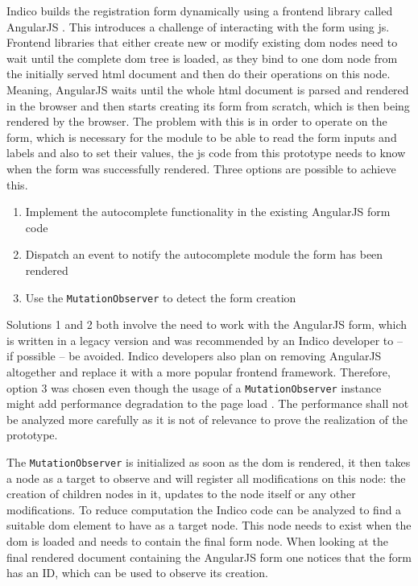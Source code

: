 Indico builds the registration form dynamically using a frontend library called AngularJS \cite{angularjs}. This introduces a challenge of interacting with the form using \gls{js}. Frontend libraries that either create new or modify existing \gls{dom} nodes need to wait until the complete \gls{dom} tree is loaded, as they bind to one \gls{dom} node from the initially served \gls{html} document and then do their operations on this node. Meaning, AngularJS waits until the whole \gls{html} document is parsed and rendered in the browser and then starts creating its form from scratch, which is then being rendered by the browser. The problem with this is in order to operate on the form, which is necessary for the module to be able to read the form inputs and labels and also to set their values, the \gls{js} code from this prototype needs to know when the form was successfully rendered. Three options are possible to achieve this.

\begin{enumerate}
    \item Implement the autocomplete functionality in the existing AngularJS form code
    \item Dispatch an event to notify the autocomplete module the form has been rendered
    \item Use the \texttt{MutationObserver} to detect the form creation
\end{enumerate}

Solutions 1 and 2 both involve the need to work with the AngularJS form, which is written in a legacy version and was recommended by an Indico developer to -- if possible -- be avoided. Indico developers also plan on removing AngularJS altogether and replace it with a more popular frontend framework. Therefore, option 3 was chosen even though the usage of a \texttt{MutationObserver} instance might add performance degradation to the page load \cite{dom-spec}. The performance shall not be analyzed more carefully as it is not of relevance to prove the realization of the prototype.

The \texttt{MutationObserver} is initialized as soon as the \gls{dom} is rendered, it then takes a node as a target to observe and will register all modifications on this node: the creation of children nodes in it, updates to the node itself or any other modifications. To reduce computation the Indico code can be analyzed to find a suitable \gls{dom} element to have as a target node. This node needs to exist when the \gls{dom} is loaded and needs to contain the final form node. When looking at the final rendered document containing the AngularJS form one notices that the form has an ID, which can be used to observe its creation.
 
